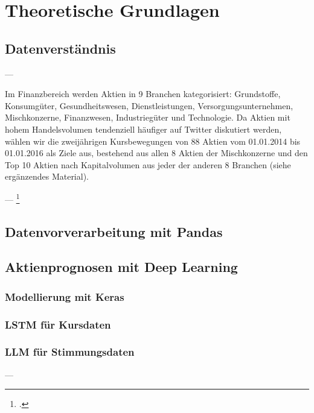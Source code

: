 \newpage
\section{Theoretische Grundlagen}\label{sec:theorie}



\subsection{Datenverständnis}\label{sec:theorie_data_understanding}

---

Im Finanzbereich werden Aktien in 9 Branchen kategorisiert: Grundstoffe, Konsumgüter, Gesundheitswesen, Dienstleistungen, Versorgungsunternehmen, Mischkonzerne, Finanzwesen, Industriegüter und Technologie. Da Aktien mit hohem Handelsvolumen tendenziell häufiger auf Twitter diskutiert werden, wählen wir die zweijährigen Kursbewegungen von 88 Aktien vom 01.01.2014 bis 01.01.2016 als Ziele aus, bestehend aus allen 8 Aktien der Mischkonzerne und den Top 10 Aktien nach Kapitalvolumen aus jeder der anderen 8 Branchen (siehe ergänzendes Material).

---
\footcite[Kap. 3]{xu2018StockMovement}

\subsection{Datenvorverarbeitung mit Pandas}\label{sec:theorie_pandas}

\subsection{Aktienprognosen mit Deep Learning}\label{sec:theorie_dl}

\subsubsection{Modellierung mit Keras}\label{sec:theorie_keras}

\subsubsection{LSTM für Kursdaten}\label{sec:theorie_lstm}

\subsubsection{LLM für Stimmungsdaten}\label{sec:theorie_llm}
---

